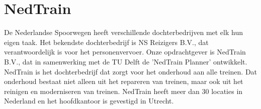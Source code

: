 \section{NedTrain}
De Nederlandse Spoorwegen heeft verschillende dochterbedrijven met elk hun eigen taak. Het bekendste dochterbedrijf is NS Reizigers B.V., dat verantwoordelijk is voor het personenvervoer. Onze opdrachtgever is NedTrain B.V., dat in samenwerking met de TU Delft de 'NedTrain Planner' ontwikkelt. NedTrain is het dochterbedrijf dat zorgt voor het onderhoud aan alle treinen. Dat onderhoud bestaat niet alleen uit het repareren van treinen, maar ook uit het reinigen en moderniseren van treinen. NedTrain heeft meer dan 30 locaties in Nederland en het hoofdkantoor is gevestigd in Utrecht. 
